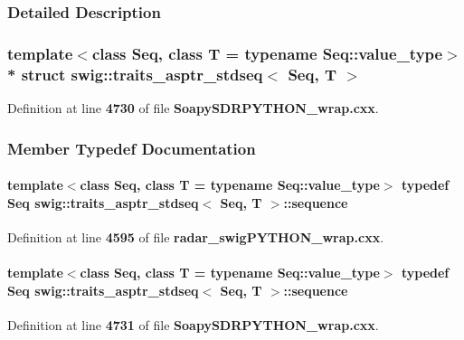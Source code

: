 \subsubsection{Detailed Description}
\subsubsection*{template$<$class Seq, class T = typename Seq\+::value\+\_\+type$>$\\*
struct swig\+::traits\+\_\+asptr\+\_\+stdseq$<$ Seq, T $>$}



Definition at line {\bf 4730} of file {\bf Soapy\+S\+D\+R\+P\+Y\+T\+H\+O\+N\+\_\+wrap.\+cxx}.



\subsubsection{Member Typedef Documentation}
\paragraph[{sequence}]{\setlength{\rightskip}{0pt plus 5cm}template$<$class Seq, class T = typename Seq\+::value\+\_\+type$>$ typedef Seq {\bf swig\+::traits\+\_\+asptr\+\_\+stdseq}$<$ Seq, T $>$\+::{\bf sequence}}\label{structswig_1_1traits__asptr__stdseq_acc3237a1f41e649f169c938930068a35}


Definition at line {\bf 4595} of file {\bf radar\+\_\+swig\+P\+Y\+T\+H\+O\+N\+\_\+wrap.\+cxx}.

\paragraph[{sequence}]{\setlength{\rightskip}{0pt plus 5cm}template$<$class Seq, class T = typename Seq\+::value\+\_\+type$>$ typedef Seq {\bf swig\+::traits\+\_\+asptr\+\_\+stdseq}$<$ Seq, T $>$\+::{\bf sequence}}\label{structswig_1_1traits__asptr__stdseq_acc3237a1f41e649f169c938930068a35}


Definition at line {\bf 4731} of file {\bf Soapy\+S\+D\+R\+P\+Y\+T\+H\+O\+N\+\_\+wrap.\+cxx}.

